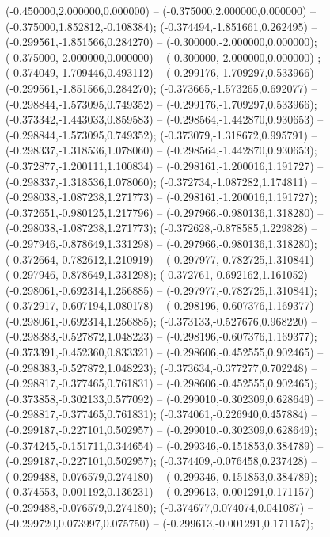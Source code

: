  (-0.450000,2.000000,0.000000) -- (-0.375000,2.000000,0.000000) -- (-0.375000,1.852812,-0.108384);
 (-0.374494,-1.851661,0.262495) -- (-0.299561,-1.851566,0.284270) -- (-0.300000,-2.000000,0.000000);
 (-0.375000,-2.000000,0.000000) -- (-0.300000,-2.000000,0.000000) ;
 (-0.374049,-1.709446,0.493112) -- (-0.299176,-1.709297,0.533966) -- (-0.299561,-1.851566,0.284270);
 (-0.373665,-1.573265,0.692077) -- (-0.298844,-1.573095,0.749352) -- (-0.299176,-1.709297,0.533966);
 (-0.373342,-1.443033,0.859583) -- (-0.298564,-1.442870,0.930653) -- (-0.298844,-1.573095,0.749352);
 (-0.373079,-1.318672,0.995791) -- (-0.298337,-1.318536,1.078060) -- (-0.298564,-1.442870,0.930653);
 (-0.372877,-1.200111,1.100834) -- (-0.298161,-1.200016,1.191727) -- (-0.298337,-1.318536,1.078060);
 (-0.372734,-1.087282,1.174811) -- (-0.298038,-1.087238,1.271773) -- (-0.298161,-1.200016,1.191727);
 (-0.372651,-0.980125,1.217796) -- (-0.297966,-0.980136,1.318280) -- (-0.298038,-1.087238,1.271773);
 (-0.372628,-0.878585,1.229828) -- (-0.297946,-0.878649,1.331298) -- (-0.297966,-0.980136,1.318280);
 (-0.372664,-0.782612,1.210919) -- (-0.297977,-0.782725,1.310841) -- (-0.297946,-0.878649,1.331298);
 (-0.372761,-0.692162,1.161052) -- (-0.298061,-0.692314,1.256885) -- (-0.297977,-0.782725,1.310841);
 (-0.372917,-0.607194,1.080178) -- (-0.298196,-0.607376,1.169377) -- (-0.298061,-0.692314,1.256885);
 (-0.373133,-0.527676,0.968220) -- (-0.298383,-0.527872,1.048223) -- (-0.298196,-0.607376,1.169377);
 (-0.373391,-0.452360,0.833321) -- (-0.298606,-0.452555,0.902465) -- (-0.298383,-0.527872,1.048223);
 (-0.373634,-0.377277,0.702248) -- (-0.298817,-0.377465,0.761831) -- (-0.298606,-0.452555,0.902465);
 (-0.373858,-0.302133,0.577092) -- (-0.299010,-0.302309,0.628649) -- (-0.298817,-0.377465,0.761831);
 (-0.374061,-0.226940,0.457884) -- (-0.299187,-0.227101,0.502957) -- (-0.299010,-0.302309,0.628649);
 (-0.374245,-0.151711,0.344654) -- (-0.299346,-0.151853,0.384789) -- (-0.299187,-0.227101,0.502957);
 (-0.374409,-0.076458,0.237428) -- (-0.299488,-0.076579,0.274180) -- (-0.299346,-0.151853,0.384789);
 (-0.374553,-0.001192,0.136231) -- (-0.299613,-0.001291,0.171157) -- (-0.299488,-0.076579,0.274180);
 (-0.374677,0.074074,0.041087) -- (-0.299720,0.073997,0.075750) -- (-0.299613,-0.001291,0.171157);
